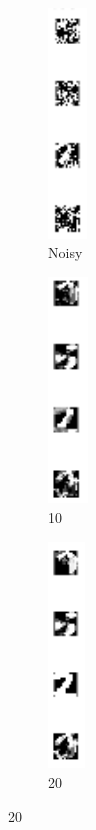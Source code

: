\documentclass[a4paper, 10pt]{article}
\begin{document}
  \begin{figure}[h]
    \centering
    \begin{subfigure}[c]{0.07\linewidth}
      \includegraphics[width=\linewidth,height=6.1cm]{lab2/digits/noisy.png}
      \caption{Noisy}
    \end{subfigure}
    \hfill
    \begin{subfigure}[c]{0.07\linewidth}
      \includegraphics[width=\linewidth,height=6cm]{lab2/digits/col_n10i10.png}
      \caption{10}
    \end{subfigure}
    \hfill
    \begin{subfigure}[c]{0.07\linewidth}
      \includegraphics[width=\linewidth,height=6cm]{lab2/digits/col_n10i20.png}
      \caption{20}
    \end{subfigure}
    \hfill

\end{figure}
\end{document}
